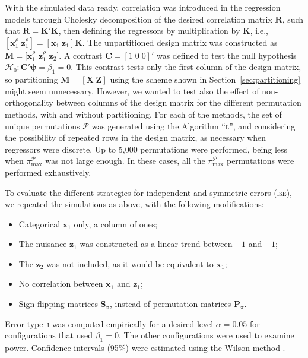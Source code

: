 With the simulated data ready, correlation was introduced in the regression models through Cholesky decomposition of the desired correlation matrix $\mathbf{R}$, such that $\mathbf{R}=\mathbf{K}'\mathbf{K}$, then defining the regressors by multiplication by $\mathbf{K}$, i.e., $[\mathbf{x}_{1}^{\rho} \; \mathbf{z}_{1}^{\rho}] = [\mathbf{x}_{1} \; \mathbf{z}_{1}]\mathbf{K}$. The unpartitioned design matrix was constructed as $\mathbf{M}=[\mathbf{x}_{1}^{\rho}$  $\mathbf{z}_{1}^{\rho}$ $\mathbf{z}_{2}]$. A contrast $\mathbf{C}=[1 \; 0 \; 0]'$ was defined to test the null hypothesis $\mathcal{H}_0 : \mathbf{C}'\boldsymbol{\psi} = \beta_{1} = 0$. This contrast tests only the first column of the design matrix, so partitioning $\mathbf{M}=[\mathbf{X} \; \mathbf{Z}]$ using the scheme shown in Section~\ref{sec:partitioning} might seem unnecessary. However, we wanted to test also the effect of non-orthogonality between columns of the design matrix for the different permutation methods, with and without partitioning. For each of the methods, the set of unique permutations $\mathcal{P}$ was generated using the Algorithm ``\textsc{l}'', and considering the possibility of repeated rows in the design matrix, as necessary when regressors were discrete. Up to 5,000 permutations were performed, being less when $\pi^{\mathcal{P}}_{\text{max}}$ was not large enough. In these cases, all the $\pi^{\mathcal{P}}_{\text{max}}$ permutations were performed exhaustively.

To evaluate the different strategies for independent and symmetric errors (\textsc{ise}), we repeated the simulations as above, with the following modifications:

\begin{itemize}
\item Categorical $\mathbf{x}_{1}$ only, a column of ones;
\item The nuisance $\mathbf{z}_{1}$ was constructed as a linear trend between $-1$ and $+1$;
\item The $\mathbf{z}_{2}$ was not included, as it would be equivalent to $\mathbf{x}_{1}$;
\item No correlation between $\mathbf{x}_{1}$ and $\mathbf{z}_{1}$;
\item Sign-flipping matrices $\mathbf{S}_{\pi}$, instead of permutation matrices $\mathbf{P}_{\pi}$.
\end{itemize}

Error type~\textsc{i} was computed empirically for a desired level $\alpha=0.05$ for configurations that used $\beta_{1}=0$. The other configurations were used to examine power. Confidence intervals (95\%) were estimated using the Wilson method \citep{Wilson1927}.

